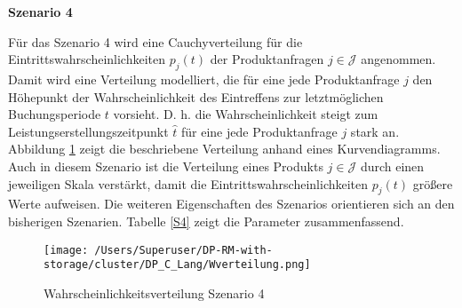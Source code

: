 \textbf{Szenario 4}

Für das Szenario 4 wird eine Cauchyverteilung für die Eintrittswahrscheinlichkeiten $p_j(t)$ der Produktanfragen $j\in\mathcal{J}$ angenommen. Damit wird eine Verteilung modelliert, die für eine jede Produktanfrage $j$ den Höhepunkt der Wahrscheinlichkeit des Eintreffens zur letztmöglichen Buchungsperiode $t$ vorsieht. D. h. die Wahrscheinlichkeit steigt zum Leistungserstellungszeitpunkt $\hat t$ für eine jede Produktanfrage $j$ stark an. Abbildung \ref{SB4} zeigt die beschriebene Verteilung anhand eines Kurvendiagramms. Auch in diesem Szenario ist die Verteilung eines Produkts $j\in\mathcal{J}$ durch einen jeweiligen Skala verstärkt, damit die Eintrittswahrscheinlichkeiten $p_j(t)$ größere Werte aufweisen. Die weiteren Eigenschaften des Szenarios orientieren sich an den bisherigen Szenarien. Tabelle \ref{S4} zeigt die Parameter  zusammenfassend.

\begin{figure}[h!]
  \begin{center}
    \texttt{[image: /Users/Superuser/DP-RM-with-storage/cluster/DP\_C\_Lang/Wverteilung.png]}
    \caption{Wahrscheinlichkeitsverteilung Szenario 4}  \label{SB4}
  \end{center}
\end{figure}

